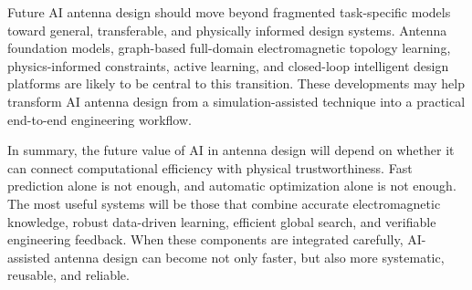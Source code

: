 \documentclass{article}
\begin{document}
Future AI antenna design should move beyond fragmented task-specific models toward general, transferable, and physically informed design systems. Antenna foundation models, graph-based full-domain electromagnetic topology learning, physics-informed constraints, active learning, and closed-loop intelligent design platforms are likely to be central to this transition. These developments may help transform AI antenna design from a simulation-assisted technique into a practical end-to-end engineering workflow.

In summary, the future value of AI in antenna design will depend on whether it can connect computational efficiency with physical trustworthiness. Fast prediction alone is not enough, and automatic optimization alone is not enough. The most useful systems will be those that combine accurate electromagnetic knowledge, robust data-driven learning, efficient global search, and verifiable engineering feedback. When these components are integrated carefully, AI-assisted antenna design can become not only faster, but also more systematic, reusable, and reliable.



\end{document}
